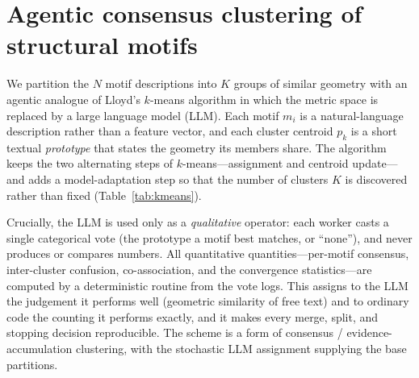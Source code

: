 
\section{Agentic consensus clustering of structural motifs}
\label{sec:cluster}

We partition the $N$ motif descriptions into $K$ groups of similar geometry with
an agentic analogue of Lloyd's $k$-means algorithm in which the metric space is
replaced by a large language model (LLM). Each motif $m_i$ is a natural-language
description rather than a feature vector, and each cluster centroid $p_k$ is a
short textual \emph{prototype} that states the geometry its members share. The
algorithm keeps the two alternating steps of $k$-means---assignment and
centroid update---and adds a model-adaptation step so that the number of clusters
$K$ is discovered rather than fixed (Table~\ref{tab:kmeans}).

Crucially, the LLM is used only as a \emph{qualitative} operator: each worker
casts a single categorical vote (the prototype a motif best matches, or
``none''), and never produces or compares numbers. All quantitative
quantities---per-motif consensus, inter-cluster confusion, co-association, and
the convergence statistics---are computed by a deterministic routine from the
vote logs. This assigns to the LLM the judgement it performs well (geometric
similarity of free text) and to ordinary code the counting it performs exactly,
and it makes every merge, split, and stopping decision reproducible. The scheme
is a form of consensus / evidence-accumulation clustering, with the stochastic
LLM assignment supplying the base partitions.

